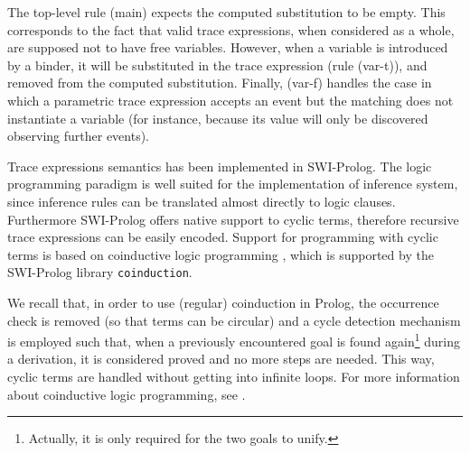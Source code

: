 The top-level rule (main) expects the computed substitution to be empty.
This corresponds to the fact that valid trace expressions, when considered as a whole, are supposed not to have free variables.
However, when a variable is introduced by a binder, it will be substituted in the trace expression (rule (var-t)), and removed from the computed substitution.
Finally, (var-f) handles the case in which a parametric trace expression accepts an event but the matching does not instantiate a variable (for instance, because its value will only be discovered observing further events).

Trace expressions semantics has been implemented in SWI-Prolog.
The logic programming paradigm is well suited for the implementation of inference system, since inference rules can be translated almost directly to logic clauses.
Furthermore SWI-Prolog offers native support to cyclic terms, therefore recursive trace expressions can be easily encoded.
Support for programming with cyclic terms is based on coinductive logic programming \cite{CoLP06}, which is supported by the SWI-Prolog library \texttt{coinduction}.

We recall that, in order to use (regular) coinduction in Prolog, the occurrence check is removed (so that terms can be circular) and a cycle detection mechanism is employed such that, when a previously encountered goal is found again\footnote{Actually, it is only required for the two goals to unify.} during a derivation, it is considered proved and no more steps are needed.
This way, cyclic terms are handled without getting into infinite loops.
For more information about coinductive logic programming, see \cite{colp}.
